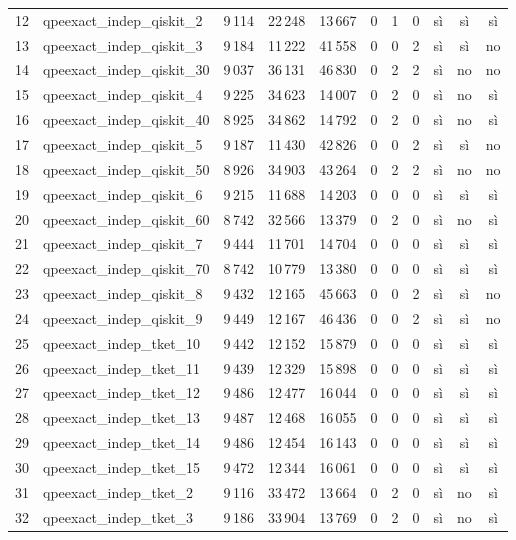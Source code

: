 \documentclass[a4paper,10pt]{article}
\begin{document}
\begin{landscape}
\begin{longtable}{r l rrr rrr ccc}
12 & qpeexact\_indep\_qiskit\_2 & 9\,114 & 22\,248 & 13\,667 & 0 & 1 & 0 & sì & sì & sì\\
13 & qpeexact\_indep\_qiskit\_3 & 9\,184 & 11\,222 & 41\,558 & 0 & 0 & 2 & sì & sì & no\\
14 & qpeexact\_indep\_qiskit\_30 & 9\,037 & 36\,131 & 46\,830 & 0 & 2 & 2 & sì & no & no\\
15 & qpeexact\_indep\_qiskit\_4 & 9\,225 & 34\,623 & 14\,007 & 0 & 2 & 0 & sì & no & sì\\
16 & qpeexact\_indep\_qiskit\_40 & 8\,925 & 34\,862 & 14\,792 & 0 & 2 & 0 & sì & no & sì\\
17 & qpeexact\_indep\_qiskit\_5 & 9\,187 & 11\,430 & 42\,826 & 0 & 0 & 2 & sì & sì & no\\
18 & qpeexact\_indep\_qiskit\_50 & 8\,926 & 34\,903 & 43\,264 & 0 & 2 & 2 & sì & no & no\\
19 & qpeexact\_indep\_qiskit\_6 & 9\,215 & 11\,688 & 14\,203 & 0 & 0 & 0 & sì & sì & sì\\
20 & qpeexact\_indep\_qiskit\_60 & 8\,742 & 32\,566 & 13\,379 & 0 & 2 & 0 & sì & no & sì\\
21 & qpeexact\_indep\_qiskit\_7 & 9\,444 & 11\,701 & 14\,704 & 0 & 0 & 0 & sì & sì & sì\\
22 & qpeexact\_indep\_qiskit\_70 & 8\,742 & 10\,779 & 13\,380 & 0 & 0 & 0 & sì & sì & sì\\
23 & qpeexact\_indep\_qiskit\_8 & 9\,432 & 12\,165 & 45\,663 & 0 & 0 & 2 & sì & sì & no\\
24 & qpeexact\_indep\_qiskit\_9 & 9\,449 & 12\,167 & 46\,436 & 0 & 0 & 2 & sì & sì & no\\
25 & qpeexact\_indep\_tket\_10 & 9\,442 & 12\,152 & 15\,879 & 0 & 0 & 0 & sì & sì & sì\\
26 & qpeexact\_indep\_tket\_11 & 9\,439 & 12\,329 & 15\,898 & 0 & 0 & 0 & sì & sì & sì\\
27 & qpeexact\_indep\_tket\_12 & 9\,486 & 12\,477 & 16\,044 & 0 & 0 & 0 & sì & sì & sì\\
28 & qpeexact\_indep\_tket\_13 & 9\,487 & 12\,468 & 16\,055 & 0 & 0 & 0 & sì & sì & sì\\
29 & qpeexact\_indep\_tket\_14 & 9\,486 & 12\,454 & 16\,143 & 0 & 0 & 0 & sì & sì & sì\\
30 & qpeexact\_indep\_tket\_15 & 9\,472 & 12\,344 & 16\,061 & 0 & 0 & 0 & sì & sì & sì\\
31 & qpeexact\_indep\_tket\_2 & 9\,116 & 33\,472 & 13\,664 & 0 & 2 & 0 & sì & no & sì\\
32 & qpeexact\_indep\_tket\_3 & 9\,186 & 33\,904 & 13\,769 & 0 & 2 & 0 & sì & no & sì\\

\end{longtable}
\end{landscape}
\end{document}
